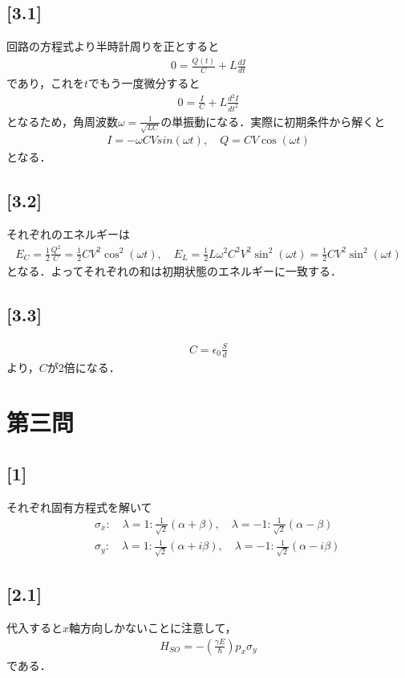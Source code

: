 \documentclass[12pt,dvipdfmx]{jsarticle}
\begin{document}
\subsection*{\large{[3.1]}}
回路の方程式より半時計周りを正とすると
\begin{eqnarray}
  0 = \frac{Q(t)}{C} + L \frac{dI}{dt}
\end{eqnarray}
であり，これを$t$でもう一度微分すると
\begin{eqnarray}
  0 = \frac{I}{C} + L \frac{d^2 I}{dt^2}
\end{eqnarray}
となるため，角周波数$\omega = \frac{1}{\sqrt{LC}}$の単振動になる．実際に初期条件から解くと
\begin{eqnarray}
  I = -\omega CV sin(\omega t),\quad Q = CV \cos(\omega t)
\end{eqnarray}
となる．
\subsection*{\large{[3.2]}}
それぞれのエネルギーは
\begin{eqnarray}
  E_C = \frac{1}{2}\frac{Q^2}{C} = \frac{1}{2}CV^2 \cos^2 (\omega t),\quad E_L = \frac{1}{2}L\omega^2 C^2 V^2 \sin^2 (\omega t) =  \frac{1}{2}CV^2 \sin^2 (\omega t)
\end{eqnarray}
となる．よってそれぞれの和は初期状態のエネルギーに一致する．
\subsection*{\large{[3.3]}}
\begin{eqnarray}
  C = \epsilon_0 \frac{S}{d}
\end{eqnarray}
より，$C$が2倍になる．
\newpage
\section*{\Large{第三問}}
\subsection*{\large{[1]}}
それぞれ固有方程式を解いて
\begin{eqnarray}
  &&\sigma_x:\quad  \lambda=1: 
  \frac{1}{\sqrt{2}}(\alpha + \beta),\quad \lambda=-1:\frac{1}{\sqrt{2}}(\alpha - \beta)\\
  &&\sigma_y:\quad  \lambda=1: 
  \frac{1}{\sqrt{2}}(\alpha +i \beta),\quad \lambda=-1:\frac{1}{\sqrt{2}}(\alpha -i \beta)
\end{eqnarray}
\subsection*{\large{[2.1]}}
代入すると$x$軸方向しかないことに注意して，
\begin{eqnarray}
  H_{SO}= -\left(  \frac{\gamma E}{\hbar}\right)p_x \sigma_y
\end{eqnarray}
である．
\end{document}
